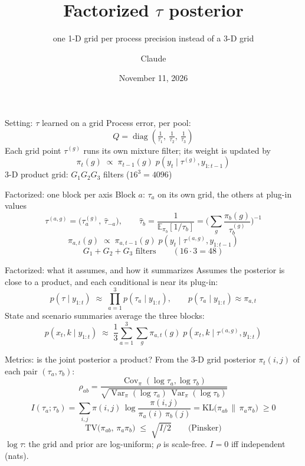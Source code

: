 \documentclass[aspectratio=169,14pt]{beamer}
\title{Factorized $\tau$ posterior}
\subtitle{one 1-D grid per process precision instead of a 3-D grid}
\author{Claude}
\date{November 11, 2026}
\newcommand{\E}{\mathbb{E}}
\newcommand{\tauhat}{\hat\tau}
\begin{document}
\begin{frame}
  \titlepage
\end{frame}

\begin{frame}{Setting: $\tau$ learned on a grid}
  Process error, per pool:
  \[
    Q = \operatorname{diag}\!\left(\tfrac{1}{\tau_1},\ \tfrac{1}{\tau_2},\ \tfrac{1}{\tau_3}\right)
  \]
  Each grid point $\tau^{(g)}$ runs its own mixture filter; its weight is updated by
  \[
    \pi_t(g) \;\propto\; \pi_{t-1}(g)\; p\!\left(y_t \mid \tau^{(g)}, y_{1:t-1}\right)
  \]
  3-D product grid: \quad $G_1 G_2 G_3$ filters \quad ($16^3 = 4096$)
\end{frame}

\begin{frame}{Factorized: one block per axis}
  Block $a$: \;$\tau_a$ on its own grid, the others at plug-in values
  \[
    \tau^{(a,g)} = \big(\tau_a^{(g)},\ \tauhat_{-a}\big),
    \qquad
    \tauhat_b = \frac{1}{\E_{\pi_b}\!\left[1/\tau_b\right]} = \Big(\sum_g \frac{\pi_b(g)}{\tau_b^{(g)}}\Big)^{-1}
  \]
  \[
    \pi_{a,t}(g) \;\propto\; \pi_{a,t-1}(g)\; p\!\left(y_t \mid \tau^{(a,g)}, y_{1:t-1}\right)
  \]
  \[
    G_1 + G_2 + G_3 \text{ filters} \qquad (16 \cdot 3 = 48)
  \]
\end{frame}

\begin{frame}{Factorized: what it assumes, and how it summarizes}
  Assumes the posterior is close to a product, and each conditional is near its plug-in:
  \[
    p(\tau \mid y_{1:t}) \;\approx\; \prod_{a=1}^{3} p(\tau_a \mid y_{1:t}),
    \qquad
    p(\tau_a \mid y_{1:t}) \approx \pi_{a,t}
  \]
  State and scenario summaries average the three blocks:
  \[
    p(x_t, k \mid y_{1:t}) \;\approx\; \frac{1}{3}\sum_{a=1}^{3}\sum_{g} \pi_{a,t}(g)\;
      p\!\left(x_t, k \mid \tau^{(a,g)}, y_{1:t}\right)
  \]
\end{frame}

\begin{frame}{Metrics: is the joint posterior a product?}
  From the 3-D grid posterior $\pi_t(i,j)$ of each pair $(\tau_a, \tau_b)$:
  \[
    \rho_{ab} = \frac{\operatorname{Cov}_\pi(\log\tau_a, \log\tau_b)}
                     {\sqrt{\operatorname{Var}_\pi(\log\tau_a)\,\operatorname{Var}_\pi(\log\tau_b)}}
  \]
  \[
    I(\tau_a;\tau_b) = \sum_{i,j}\pi(i,j)\,\log\frac{\pi(i,j)}{\pi_a(i)\,\pi_b(j)}
      = \mathrm{KL}\big(\pi_{ab}\,\|\,\pi_a\pi_b\big) \;\ge 0
  \]
  \[
    \mathrm{TV}\big(\pi_{ab},\,\pi_a\pi_b\big) \;\le\; \sqrt{I/2}
    \qquad\text{(Pinsker)}
  \]
  {\small $\log\tau$: the grid and prior are log-uniform; $\rho$ is scale-free. $I = 0$ iff independent (nats).}
\end{frame}
\end{document}
